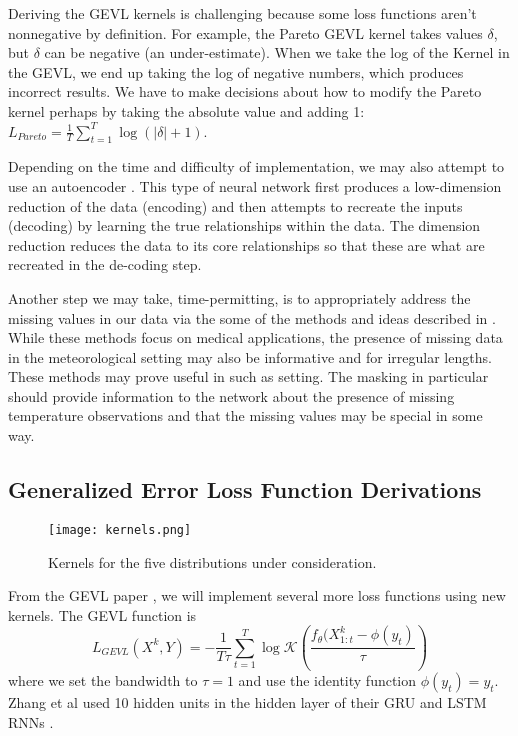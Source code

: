 \documentclass[conference]{IEEEtran}
\begin{document}
Deriving the GEVL kernels is challenging because some loss functions aren't nonnegative by definition. For example, the Pareto GEVL kernel takes values $\delta$, but $\delta$ can be negative (an under-estimate). When we take the log of the Kernel in the GEVL, we end up taking the log of negative numbers, which produces incorrect results. We have to make decisions about how to modify the Pareto kernel perhaps by taking the absolute value and adding 1: $L_{Pareto} = \frac{1}{T}\sum_{t=1}^T \log(|\delta| + 1)$.

Depending on the time and difficulty of implementation, we may also attempt to use an autoencoder \cite{IntroAutoencodersTensorFlow}. This type of neural network first produces a low-dimension reduction of the data (encoding) and then attempts to recreate the inputs (decoding) by learning the true relationships within the data. The dimension reduction reduces the data to its core relationships so that these are what are recreated in the de-coding step.

Another step we may take, time-permitting, is to appropriately address the missing values in our data via the some of the methods and ideas described in \cite{tanDATAGRUDualAttentionTimeAware2020, cheRecurrentNeuralNetworks2018}. While these methods focus on medical applications, the presence of missing data in the meteorological setting may also be informative and for irregular lengths. These methods may prove useful in such as setting. The masking in particular should provide information to the network about the presence of missing temperature observations and that the missing values may be special in some way.

\subsection{Generalized Error Loss Function Derivations}

\begin{figure}[hb]
    \centering
    \texttt{[image: kernels.png]}
    \caption{Kernels for the five distributions under consideration.}
    \label{fig:kernels}
\end{figure}

From the GEVL paper \cite{zhangEnhancingTimeSeries2021}, we will implement several more loss functions using new kernels. The GEVL function is
$$L_{GEVL}(X^k, Y) = -\frac{1}{T\tau} \sum_{t=1}^T \log \mathcal{K}\left(\frac{f_\theta (X^k_{1:t} - \phi(y_t)}{\tau}\right)$$ 
where we set the bandwidth to $\tau = 1$ and use the identity function $\phi(y_t) = y_t$. Zhang et al used 10 hidden units in the hidden layer of their GRU and LSTM RNNs \cite{zhangEnhancingTimeSeries2021}.
\end{document}

